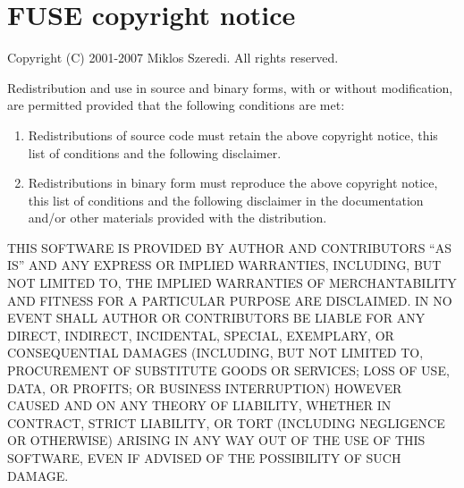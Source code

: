 \chapter{FUSE copyright notice}
\label{app:copyright}

\noindent
Copyright (C) 2001-2007 Miklos Szeredi. All rights reserved.

\vspace{2ex}
\noindent
Redistribution and use in source and binary forms, with or without modification,
are permitted provided that the following conditions are met:
\begin{enumerate}
	\item Redistributions of source code must retain the above copyright notice,
		  this list of conditions and the following disclaimer.
	\item Redistributions in binary form must reproduce the above copyright
		  notice, this list of conditions and the following disclaimer in the
		  documentation and/or other materials provided with the distribution.
\end{enumerate}

\noindent
THIS SOFTWARE IS PROVIDED BY AUTHOR AND CONTRIBUTORS ``AS IS'' AND
ANY EXPRESS OR IMPLIED WARRANTIES, INCLUDING, BUT NOT LIMITED TO, THE
IMPLIED WARRANTIES OF MERCHANTABILITY AND FITNESS FOR A PARTICULAR PURPOSE
ARE DISCLAIMED.  IN NO EVENT SHALL AUTHOR OR CONTRIBUTORS BE LIABLE
FOR ANY DIRECT, INDIRECT, INCIDENTAL, SPECIAL, EXEMPLARY, OR CONSEQUENTIAL
DAMAGES (INCLUDING, BUT NOT LIMITED TO, PROCUREMENT OF SUBSTITUTE GOODS
OR SERVICES; LOSS OF USE, DATA, OR PROFITS; OR BUSINESS INTERRUPTION)
HOWEVER CAUSED AND ON ANY THEORY OF LIABILITY, WHETHER IN CONTRACT, STRICT
LIABILITY, OR TORT (INCLUDING NEGLIGENCE OR OTHERWISE) ARISING IN ANY WAY
OUT OF THE USE OF THIS SOFTWARE, EVEN IF ADVISED OF THE POSSIBILITY OF
SUCH DAMAGE.
